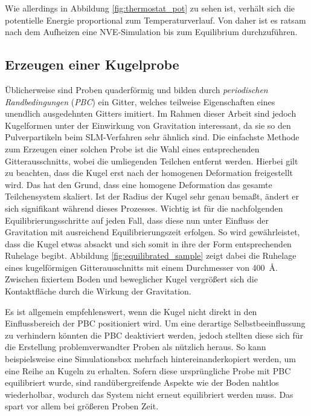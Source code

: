 		Wie allerdings in Abbildung \ref{fig:thermostat_pot} zu sehen ist, verhält sich die
		potentielle Energie proportional zum Temperaturverlauf. Von daher ist es ratsam nach dem
		Aufheizen eine NVE-Simulation bis zum Equilibrium durchzuführen.

	\subsection{Erzeugen einer Kugelprobe}
		Üblicherweise sind Proben quaderförmig und bilden durch \emph{periodischen Randbedingungen}
		(\emph{PBC}) ein Gitter, welches teilweise Eigenschaften eines unendlich ausgedehnten
		Gitters imitiert. Im Rahmen dieser Arbeit sind jedoch Kugelformen unter der Einwirkung von
		Gravitation interessant, da sie so den Pulverpartikeln beim SLM-Verfahren sehr ähnlich
		sind. Die einfachste Methode zum Erzeugen einer solchen Probe ist die Wahl eines
		entsprechenden Gitterausschnitts, wobei die umliegenden Teilchen entfernt werden.
		Hierbei gilt zu beachten, dass die Kugel erst nach der homogenen Deformation freigestellt
		wird. Das hat den Grund, dass eine homogene Deformation das gesamte Teilchensystem
		skaliert. Ist der Radius der Kugel sehr genau bemaßt, ändert er sich signifikant während
		dieses Prozesses. Wichtig ist für die nachfolgenden Equilibrierungsschritte auf jeden
		Fall, dass diese nun unter Einfluss der Gravitation mit ausreichend Equilibrierungszeit
		erfolgen. So wird gewährleistet, dass die Kugel etwas absackt und sich somit in ihre der
		Form entsprechenden Ruhelage begibt. Abbildung \ref{fig:equilibrated_sample} zeigt dabei
		die Ruhelage eines kugelförmigen Gitterausschnitts mit einem Durchmesser von
		\SI{400}{\angstrom}. Zwischen fixiertem Boden und beweglicher Kugel vergrößert sich die
		Kontaktfläche durch die Wirkung der Gravitation.

		Es ist allgemein empfehlenswert, wenn die Kugel nicht direkt in den Einflussbereich der
		PBC positioniert wird. Um eine derartige Selbstbeeinflussung zu verhindern könnten die PBC
		deaktiviert werden, jedoch stellten diese sich für die Erstellung problemverwandter Proben
		als nützlich heraus. So kann beispielsweise eine Simulationsbox mehrfach
		hintereinanderkopiert werden, um eine Reihe an Kugeln zu erhalten. Sofern diese
		ursprüngliche Probe mit PBC equilibriert wurde, sind randübergreifende Aspekte wie der
		Boden nahtlos wiederholbar, wodurch das System nicht erneut equilibriert werden muss. Das
		spart vor allem bei größeren Proben Zeit.

